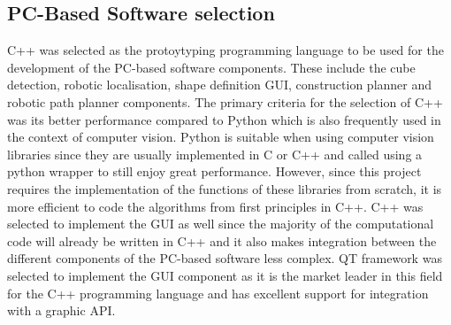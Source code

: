 \subsection{PC-Based Software selection}

C++ was selected as the protoytyping programming language to be used for the development of the PC-based software components. These include the cube detection, robotic localisation, shape definition \ac{GUI}, construction planner and robotic path planner components. The primary criteria for the selection of C++ was its better performance compared to Python which is also frequently used in the context of computer vision. Python is suitable when using computer vision libraries since they are usually implemented in C or C++ and called using a python wrapper to still enjoy great performance. However, since this project requires the implementation of the functions of these libraries from scratch, it is more efficient to code the algorithms from first principles in C++. C++ was selected to implement the \ac{GUI} as well since the majority of the computational code will already be written in C++ and it also makes integration between the different components of the PC-based software less complex. QT framework was selected to implement the \ac{GUI} component as it is the market leader in this field for the C++ programming language and has excellent support for integration with a graphic \ac{API}.

\pendsign